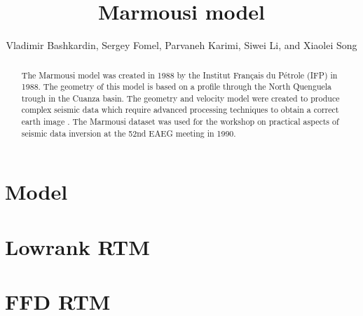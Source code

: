 \author{Vladimir Bashkardin, Sergey Fomel, Parvaneh Karimi, Siwei Li, and Xiaolei Song}
\title{Marmousi model}

\maketitle

\begin{abstract}
The Marmousi model was created in 1988 by the Institut Fran\c{c}ais du
P\'{e}trole (IFP) in 1988.  The geometry of this model is based on a
profile through the North Quenguela trough in the Cuanza basin. The
geometry and velocity model were created to produce complex seismic
data which require advanced processing techniques to obtain a correct
earth image \cite[]{TLE13-09-09270936}. The Marmousi dataset was used
for the workshop on practical aspects of seismic data inversion at the
52nd EAEG meeting in 1990.
\end{abstract}

\section{Model}

 \clearpage
{} \clearpage

 \clearpage

 \clearpage

 \clearpage
{} \clearpage

\section{Lowrank RTM}

 \clearpage
{} \clearpage

\section{FFD RTM}


